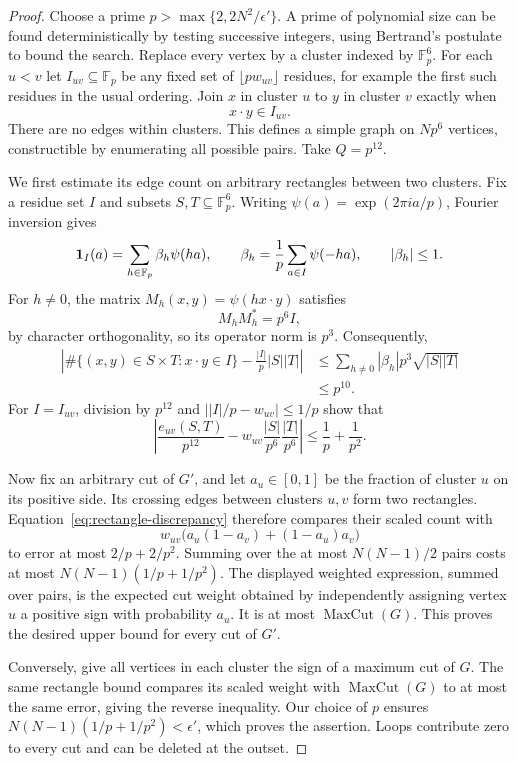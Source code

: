 \begin{proof}
Choose a prime $p>\max\{2,2N^2/\epsilon'\}$. A prime of polynomial size can be found deterministically
by testing successive integers, using Bertrand's postulate to bound the
search. Replace every vertex by a cluster indexed by $\mathbb F_p^6$.
For each $u<v$ let $I_{uv}\subseteq\mathbb F_p$ be any fixed set of
$\lfloor p w_{uv}\rfloor$ residues, for example the first such residues
in the usual ordering. Join $x$ in cluster $u$ to $y$ in cluster $v$
exactly when
\[
 x\cdot y\in I_{uv}.
\]
There are no edges within clusters. This defines a simple graph on
$Np^6$ vertices, constructible by enumerating all possible pairs.
Take $Q=p^{12}$.

We first estimate its edge count on arbitrary rectangles between two
clusters. Fix a residue set $I$ and subsets $S,T\subseteq\mathbb F_p^6$.
Writing $\psi(a)=\exp(2\pi i a/p)$, Fourier inversion gives
\[
 \mathbf 1_I(a)=\sum_{h\in\mathbb F_p}\beta_h\psi(ha),\qquad
 \beta_h=\frac1p\sum_{a\in I}\psi(-ha),\qquad
 |\beta_h|\le1.
\]
For $h\ne0$, the matrix $M_h(x,y)=\psi(hx\cdot y)$ satisfies
\[
 M_hM_h^*=p^6 I,
\]
by character orthogonality, so its operator norm is $p^3$. Consequently,
\begin{align*}
 \left|\#\{(x,y)\in S\times T:x\cdot y\in I\}
                -\frac{|I|}{p}|S||T|\right|
 &\le\sum_{h\ne0}|\beta_h|p^3\sqrt{|S||T|}\\
 &\le p^{10}.
\end{align*}
For $I=I_{uv}$, division by $p^{12}$ and
$\bigl||I|/p-w_{uv}\bigr|\le1/p$ show that
\begin{equation}\label{eq:rectangle-discrepancy}
 \left|\frac{e_{uv}(S,T)}{p^{12}}
       -w_{uv}\frac{|S|}{p^6}\frac{|T|}{p^6}\right|
 \le\frac1p+\frac1{p^2}.
\end{equation}

Now fix an arbitrary cut of $G'$, and let $a_u\in[0,1]$ be the
fraction of cluster $u$ on its positive side. Its crossing edges between
clusters $u,v$ form two rectangles. Equation~\eqref{eq:rectangle-discrepancy}
therefore compares their scaled count with
\[
 w_{uv}\bigl(a_u(1-a_v)+(1-a_u)a_v\bigr)
\]
to error at most $2/p+2/p^2$.
Summing over the at most $N(N-1)/2$ pairs costs at most
$N(N-1)(1/p+1/p^2)$. The displayed weighted expression, summed over
pairs, is the expected cut weight obtained by independently assigning
vertex $u$ a positive sign with probability $a_u$. It is at most
$\operatorname{MaxCut}(G)$. This proves the desired upper bound for
every cut of $G'$.

Conversely, give all vertices in each cluster the sign of a maximum cut
of $G$. The same rectangle bound compares its scaled weight with
$\operatorname{MaxCut}(G)$ to at most the same error, giving the reverse
inequality. Our choice of $p$ ensures
$N(N-1)(1/p+1/p^2)<\epsilon'$, which proves the assertion.
Loops contribute zero to every cut and can be deleted at the outset.
\end{proof}
